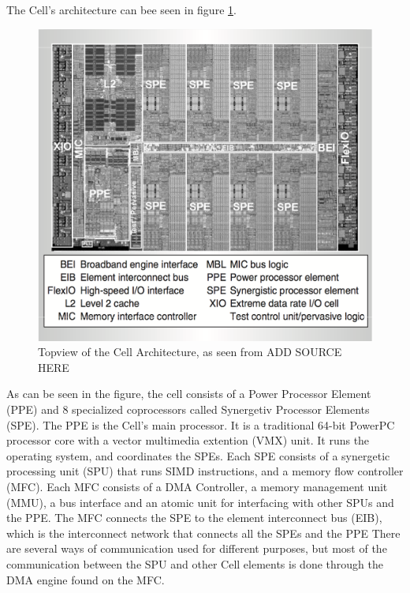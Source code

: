 The Cell's architecture can bee seen in figure \ref{fig:CellTop}.
\begin{figure}[h!]
    \centering
    \includegraphics[width=1\textwidth]{Figures/DMA/CellTop}
    \caption{Topview of the Cell Architecture, as seen from ADD SOURCE HERE}
    \label{fig:CellTop}
\end{figure}

As can be seen in the figure, the cell consists of a Power Processor Element (PPE) and 8 specialized coprocessors called Synergetiv Processor Elements (SPE).
The PPE is the Cell's main processor.
It is a traditional 64-bit PowerPC processor core with a vector multimedia extention (VMX) unit.
It runs the operating system, and coordinates the SPEs.
Each SPE consists of a synergetic processing unit (SPU) that runs SIMD instructions, and a memory flow controller (MFC).
Each MFC consists of a DMA Controller, a memory management unit (MMU), a bus interface and an atomic unit for interfacing with other SPUs and the PPE.
The MFC connects the SPE to the element interconnect bus (EIB), which is the interconnect network that connects all the SPEs and the PPE
There are several ways of communication used for different purposes, but most of the communication between the SPU and other Cell elements is done through the DMA engine found on the MFC.

